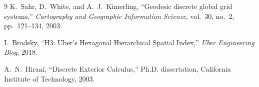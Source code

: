 \documentclass[10pt,twocolumn,letterpaper]{article}
\begin{document}
\begin{thebibliography}{9}
K.~Sahr, D.~White, and A.~J.~Kimerling,
``Geodesic discrete global grid systems,''
\emph{Cartography and Geographic Information Science}, vol.~30, no.~2, pp.~121--134, 2003.

I.~Brodsky,
``H3: Uber's Hexagonal Hierarchical Spatial Index,''
\emph{Uber Engineering Blog}, 2018.

A.~N.~Hirani,
``Discrete Exterior Calculus,''
Ph.D. dissertation, California Institute of Technology, 2003.
\end{thebibliography}
\end{document}
